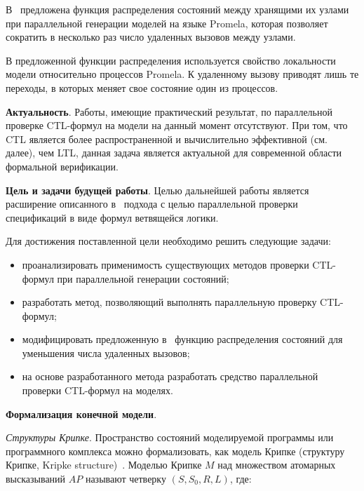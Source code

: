 \documentclass[a4paper,notitlepage,14pt]{article}
\begin{document}
В~\cite{Korotkov10Miem} предложена функция распределения состояний между хранящими их
узлами при параллельной генерации моделей на языке Promela, которая позволяет сократить в
несколько раз число удаленных вызовов между узлами.

В предложенной функции распределения используется свойство локальности модели относительно
процессов Promela. К удаленному вызову приводят лишь те переходы, в которых меняет свое
состояние один из процессов.


\textbf{Актуальность}. Работы, имеющие практический результат, по параллельной проверке
CTL-формул на модели на данный момент отсутствуют. При том, что CTL является более
распространенной и вычислительно эффективной (см. далее), чем LTL, данная задача является
актуальной для современной области формальной верификации.


\textbf{Цель и задачи будущей работы}. Целью дальнейшей работы является расширение
описанного в~\cite{Korotkov10Miem} подхода с целью параллельной проверки спецификаций в
виде формул ветвящейся логики.

Для достижения поставленной цели необходимо решить следующие задачи:

\begin{itemize}
\item проанализировать применимость существующих методов проверки CTL-формул при
  параллельной генерации состояний;
\item разработать метод, позволяющий выполнять параллельную проверку CTL-формул;
\item модифицировать предложенную в~\cite{Korotkov10Miem} функцию распределения состояний
  для уменьшения числа удаленных вызовов;
\item на основе разработанного метода разработать средство параллельной проверки
  CTL-формул на моделях.
\end{itemize}


\textbf{Формализация конечной модели}.

\textit{Структуры Крипке}. Пространство состояний моделируемой программы или программного
комплекса можно формализовать, как модель Крипке (структуру Крипке, Kripke
structure)~\cite{Clarke}. Моделью Крипке $M$ над множеством атомарных высказываний $AP$
называют четверку $(S, S_0, R, L)$, где:
\end{document}
